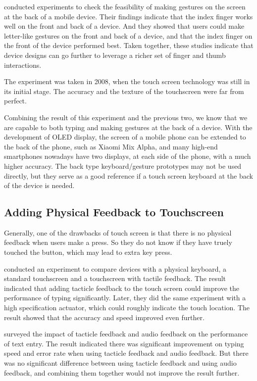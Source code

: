 \documentclass[11pt]{article}
\begin{document}
\citet{handposture2008} conducted experiments to check the feasibility of making gestures on the screen at the back of a mobile device. Their findings indicate that the index finger works well on the front and back of a device. And they showed that users could make letter-like gestures on the front and back of a device, and that the index finger on the front of the device performed best. Taken together, these studies indicate that device designs can go further to leverage a richer set of finger and thumb interactions. 

The experiment was taken in 2008, when the touch screen technology was still in its initial stage. The accuracy and the texture of the touchscreen were far from perfect.

Combining the result of this experiment and the previous two, we know that we are capable to both typing and making gestures at the back of a device. With the development of OLED display, the screen of a mobile phone can be extended to the back of the phone, such as Xiaomi Mix Alpha, and many high-end smartphones nowadays have two displays, at each side of the phone, with a much higher accuracy. The back type keyboard/gesture prototypes may not be used directly, but they serve as a good reference if a touch screen keyboard at the back of the device is needed. 

\subsection{Adding Physical Feedback to Touchscreen}

Generally, one of the drawbacks of touch screen is that there is no physical feedback when users make a press. So they do not know if they have truely touched the button, which may lead to extra key press.

\citet{tactilefeedback2008} conducted an experiment to compare devices with a physical keyboard, a standard touchscreen and a touchscreen with tactile feedback. The result indicated that adding tacticle feedback to the touch screen could improve the performance of typing significantly. Later, they did the same experiment with a high specification actuator, which could roughly indicate the touch location. The result showed that the accuracy and speed improved even further. 

\citet{10.1145/1518701.1518750} surveyed the impact of tacticle feedback and audio feedback on the performance of text entry. The result indicated there was significant improvement on typing speed and error rate when using tacticle feedback and audio feedback. But there was no significant difference between using tacticle feedback and using audio feedback, and combining them together would not improve the result further. 
\end{document}
